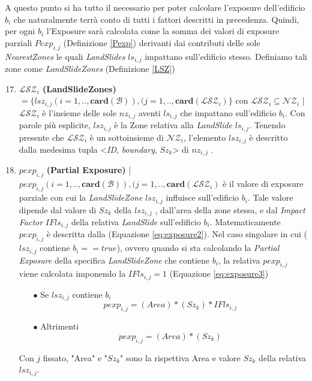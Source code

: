 \newpage 
A questo punto si ha tutto il necessario per poter calcolare l'exposure dell'edificio $b_i$ che naturalmente terrà conto di tutti i fattori descritti in precedenza. Quindi, per ogni $b_i$ l'Exposure sarà calcolata come la somma dei valori di exposure parziali $Pexp_{i,j}$ (Definizione \ref{Pexp}) derivanti dai contributi delle sole \textit{NearestZones} le quali \textit{LandSlides} $ls_{i,j}$ impattano sull'edificio stesso.
Definiamo tali zone come \textit{LandSlideZones} (Definizione \ref{LSZ})

\begin{enumerate}
	\setcounter{enumi}{16}

	\item \label{LSZ} \textbf{$ \mathcal{LSZ}_i $ (LandSlideZones)} $ = \{lsz_{i,j}(i=1,..,\mathbf{card}(\mathcal{B})),(j=1,..,\mathbf{card}(\mathcal{LSZ}_i)\}$ con $\mathcal{LSZ}_i \subseteq \mathcal{NZ}_i$ | $\mathcal{LSZ}_i$ 
	è l'insieme delle sole $nz_{i,j}$ aventi $ls_{i,j}$ che impattano sull'edificio $b_i$. 
	Con parole più esplicite, $lsz_{i,j}$ è la Zone relativa alla \textit{LandSlide} $ls_{i,j}$. 
	Tenendo presente che $\mathcal{LSZ}_i$ è un sottoinsieme di $\mathcal{NZ}_i$, l'elemento $lsz_{i,j}$  è descritto dalla medesima tupla <\textit{ID}, \textit{boundary}, \textit{$Sz_k$}> di $nz_{i,j}$ . 
	
	\item \label{Pexp} $pexp_{i,j}$ \textbf{(Partial Exposure)} | $ pexp_{i,j}(i=1,..,\mathbf{card}(\mathcal{B})),(j=1,..,\mathbf{card}(\mathcal{LSZ}_i)$ è il valore di exposure parziale con cui la \textit{LandSlideZone} $lsz_{i,j}$ influisce sull'edificio $b_i$. Tale valore dipende dal valore di $Sz_k$ della $lsz_{i,j}$ , dall'area della zone stessa, e dal \textit{Impact Factor} $IFls_{i,j}$ della relativa \textit{LandSlide} sull'edificio $b_i$. Matematicamente $pexp_{i,j}$ è descritta dalla (Equazione \ref{eq:exposure2}). Nel caso singolare in cui ($lsz_{i,j}$ contiene $b_i==true$), ovvero quando si sta calcolando la \textit{Partial Exposure} della specifica \textit{LandSlideZone} che contiene $b_i$, la relativa $pexp_{i,j}$ viene calcolata imponendo la $IFls_{i,j}=1$ (Equazione \ref{eq:exposure3})  
	\\
	\begin{enumerate}
		\item[$\bullet$] Se $lsz_{i,j}$ contiene $b_i$
		\begin{equation}\label{eq:exposure2}
		pexp_{i,j} =(Area)*(Sz_{k}) * IFls_{i,j}
		\end{equation}
		
		\item[$\bullet$] Altrimenti
		\begin{equation}\label{eq:exposure3}
		pexp_{i,j} =(Area)*(Sz_{k})
		\end{equation}
	\end{enumerate}

	{Con $j$ fissato, "Area" e "$Sz_k$" sono la rispettiva Area e valore $Sz_k$ della relativa $lsz_{i,j}$.}
	
\end{enumerate}

